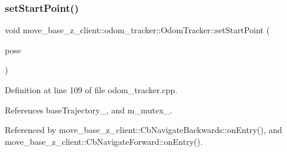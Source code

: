 \subsubsection{\texorpdfstring{set\+Start\+Point()}{setStartPoint()}}
{\footnotesize\ttfamily void move\+\_\+base\+\_\+z\+\_\+client\+::odom\+\_\+tracker\+::\+Odom\+Tracker\+::set\+Start\+Point (\begin{DoxyParamCaption}\item[{const geometry\+\_\+msgs\+::\+Pose\+Stamped \&}]{pose }\end{DoxyParamCaption})}



Definition at line 109 of file odom\+\_\+tracker.\+cpp.



References base\+Trajectory\+\_\+, and m\+\_\+mutex\+\_\+.



Referenced by move\+\_\+base\+\_\+z\+\_\+client\+::\+Cb\+Navigate\+Backwards\+::on\+Entry(), and move\+\_\+base\+\_\+z\+\_\+client\+::\+Cb\+Navigate\+Forward\+::on\+Entry().


